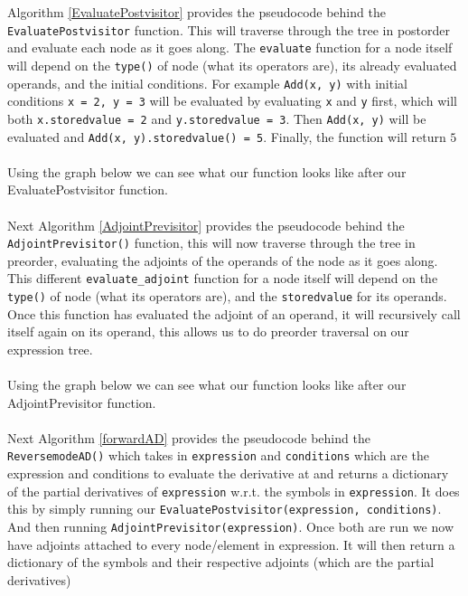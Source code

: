 \documentclass{article}
\begin{document}
Algorithm \ref{EvaluatePostvisitor} provides the pseudocode behind the \verb|EvaluatePostvisitor| function. This will traverse through the tree in postorder and evaluate each node as it goes along. The \verb|evaluate| function for a node itself will depend on the \verb|type()| of node (what its operators are), its already evaluated operands, and the initial conditions. For example \verb|Add(x, y)| with initial conditions \verb|x = 2, y = 3| will be evaluated by evaluating \verb|x| and \verb|y| first, which will both \verb|x.storedvalue = 2| and \verb|y.storedvalue = 3|. Then \verb|Add(x, y)| will be evaluated and \verb|Add(x, y).storedvalue() = 5|. Finally, the function will return $5$
\\\\
Using the graph below we can see what our function looks like after our EvaluatePostvisitor function.
\\\\
Next Algorithm \ref{AdjointPrevisitor} provides the pseudocode behind the \verb|AdjointPrevisitor()| function, this will now traverse through the tree in preorder, evaluating the adjoints of the operands of the node as it goes along. This different \verb|evaluate_adjoint| function for a node itself will depend on the \verb|type()| of node (what its operators are), and the \verb|storedvalue| for its operands. Once this function has evaluated the adjoint of an operand, it will recursively call itself again on its operand, this allows us to do preorder traversal on our expression tree.
\\\\
Using the graph below we can see what our function looks like after our AdjointPrevisitor function.
\\\\
Next Algorithm \ref{forwardAD} provides the pseudocode behind the \verb|ReversemodeAD()| which takes in \verb|expression| and \verb|conditions| which are the expression and conditions to evaluate the derivative at and returns a dictionary of the partial derivatives of \verb|expression| w.r.t. the symbols in \verb|expression|. It does this by simply running our \verb|EvaluatePostvisitor(expression, conditions)|. And then running \verb|AdjointPrevisitor(expression)|. Once both are run we now have adjoints attached to every node/element in expression. It will then return a dictionary of the symbols and their respective adjoints (which are the partial derivatives)
\end{document}
